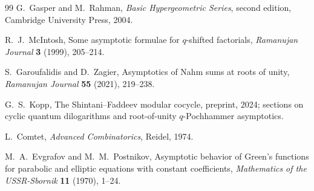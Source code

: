 \documentclass[11pt]{article}
\theoremstyle{definition}
\begin{document}
\begin{thebibliography}{99}
G.~Gasper and M.~Rahman,
\newblock \emph{Basic Hypergeometric Series}, second edition,
\newblock Cambridge University Press, 2004.

R.~J.~McIntosh,
\newblock Some asymptotic formulae for $q$-shifted factorials,
\newblock \emph{Ramanujan Journal} \textbf{3} (1999), 205--214.

S.~Garoufalidis and D.~Zagier,
\newblock Asymptotics of Nahm sums at roots of unity,
\newblock \emph{Ramanujan Journal} \textbf{55} (2021), 219--238.

G.~S.~Kopp,
\newblock The Shintani--Faddeev modular cocycle,
\newblock preprint, 2024; sections on cyclic quantum dilogarithms and root-of-unity $q$-Pochhammer asymptotics.

L.~Comtet,
\newblock \emph{Advanced Combinatorics},
\newblock Reidel, 1974.

M.~A.~Evgrafov and M.~M.~Postnikov,
\newblock Asymptotic behavior of Green's functions for parabolic and elliptic equations with constant coefficients,
\newblock \emph{Mathematics of the USSR-Sbornik} \textbf{11} (1970), 1--24.

\end{thebibliography}
\end{document}
